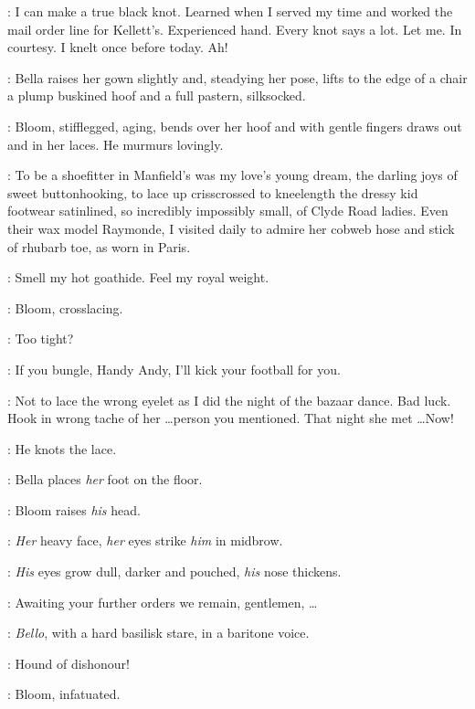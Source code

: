 \Bloom:
I can make a true black knot.
Learned when I served my time and worked the mail order line for Kellett's.
Experienced hand.
Every knot says a lot.
Let me.
In courtesy.
I knelt once before today.
Ah!

:
Bella raises her gown slightly and, steadying her pose,
lifts to the edge of a chair a plump buskined hoof
and a full pastern, silksocked.

:
Bloom, stifflegged, aging, bends over her hoof
and with gentle fingers draws out and in her laces.
He murmurs lovingly.

\Bloom:
To be a shoefitter in Manfield's was my love's young dream,
the darling joys of sweet buttonhooking,
to lace up crisscrossed to kneelength the dressy kid footwear satinlined,
so incredibly impossibly small, of Clyde Road ladies.
Even their wax model Raymonde, I visited daily
to admire her cobweb hose and stick of rhubarb toe, as worn in Paris.

\Hoof[2]:
Smell my hot goathide.
Feel my royal weight.

:
Bloom, crosslacing.

\Bloom:
Too tight?

\Hoof:
If you bungle, Handy Andy, I'll kick your football for you.

\Bloom:
Not to lace the wrong eyelet as I did the night of the bazaar dance.
Bad luck.
Hook in wrong tache of her \ldots person you mentioned.
That night she met \ldots Now!

:
He knots the lace.


:
Bella places \emph{her} foot on the floor.

:
Bloom raises \emph{his} head.

:
\emph{Her} heavy face, \emph{her} eyes strike \emph{him} in midbrow.

:
\emph{His} eyes grow dull, darker and pouched, \emph{his} nose thickens.

\Bloom:
Awaiting your further orders we remain, gentlemen, \ldots

:
\emph{Bello}, with a hard basilisk stare, in a baritone voice.

\Bello:
Hound of dishonour!

:
Bloom, infatuated.

